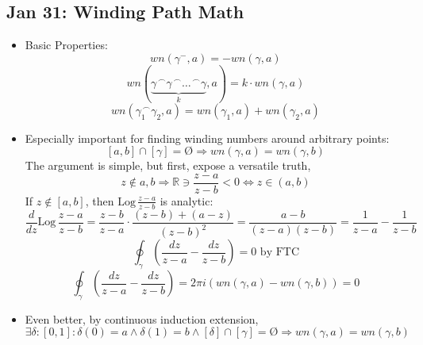 \documentclass[10pt, oneside]{article}
\newcommand{\cat}{^{\,\smallfrown}}
\newcommand{\R}{\mathbb{R}}
\let\foo\O
\renewcommand{\O}{\text{\foo}}
\newcommand{\Log}{\text{Log} \,}
\begin{document}
\subsection{Jan 31: Winding Path Math}
\begin{itemize}
    \item Basic Properties:
        \[wn(\gamma^-,a) = -wn(\gamma,a)\]
        \[wn(\underbrace{\gamma \cat \gamma \cat \hdots \cat \gamma}_k,a) = k\cdot wn(\gamma,a)\]
        \[wn(\gamma_1 \cat \gamma_2,a) = wn(\gamma_1,a) + wn(\gamma_2,a)\]
    \item Especially important for finding winding numbers around arbitrary points:
        \[[a,b] \cap [\gamma] = \O \Rightarrow wn(\gamma,a) = wn(\gamma,b)\]
        The argument is simple, but first, expose a versatile truth,
        \[z \notin {a,b} \Rightarrow \R \ni \frac{z-a}{z-b} < 0 \Leftrightarrow z \in (a,b)\]
        If $z \notin [a,b]$, then $\Log \frac{z-a}{z-b}$ is analytic:
        \[\frac{d}{dz} \Log \frac{z-a}{z-b} = \frac{z-b}{z-a} \cdot \frac{(z-b) + (a-z)}{(z-b)^2} = \frac{a-b}{(z-a)(z-b)} = \frac{1}{z-a} - \frac{1}{z-b}\]
        \[\oint_\gamma \left( \frac{dz}{z-a} - \frac{dz}{z-b} \right) = 0 \text{ by FTC}\]
        \[\oint_\gamma \left( \frac{dz}{z-a} - \frac{dz}{z-b} \right) = 2\pi i (wn(\gamma,a) - wn(\gamma,b)) = 0\]
    \item Even better, by continuous induction extension, 
        \[\exists \delta:[0,1] : \delta(0) = a \land \delta(1) = b \land [\delta] \cap [\gamma] = \O \Rightarrow wn(\gamma,a) = wn(\gamma,b)\]
\end{itemize}
\end{document}
